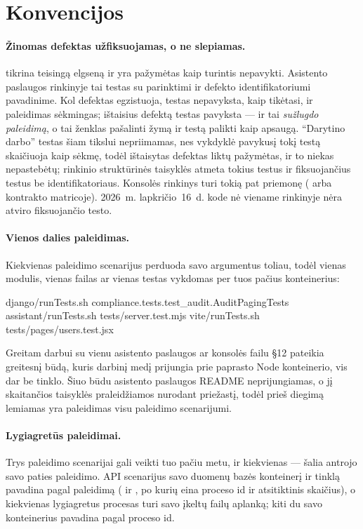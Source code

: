 \section{Konvencijos}\label{sec:testing:conventions}

\paragraph{Žinomas defektas užfiksuojamas, o ne slepiamas.}  tikrina
teisingą elgseną ir yra pažymėtas kaip turintis nepavykti. Asistento paslaugos rinkinyje tai
testas su parinktimi  ir defekto identifikatoriumi pavadinime. Kol defektas
egzistuoja, testas nepavyksta, kaip tikėtasi, ir paleidimas sėkmingas; ištaisius defektą testas
pavyksta --- ir tai \emph{sužlugdo paleidimą}, o tai ženklas pašalinti žymą ir testą palikti kaip
apsaugą. \enquote{Darytino darbo} testas šiam tikslui nepriimamas, nes vykdyklė pavykusį tokį
testą skaičiuoja kaip sėkmę, todėl ištaisytas defektas liktų pažymėtas, ir to niekas nepastebėtų; rinkinio
struktūrinės taisyklės atmeta tokius testus ir fiksuojančius testus be identifikatoriaus.
Konsolės rinkinys turi tokią pat priemonę ( arba  kontrakto
matricoje). 2026~m. lapkričio~16~d. kode nė viename rinkinyje nėra atviro fiksuojančio testo.

\paragraph{Vienos dalies paleidimas.} Kiekvienas paleidimo scenarijus perduoda savo argumentus
toliau, todėl vienas modulis, vienas failas ar vienas testas vykdomas per tuos pačius
konteinerius:

\begin{codeblock}
django/runTests.sh compliance.tests.test_audit.AuditPagingTests
assistant/runTests.sh tests/server.test.mjs
vite/runTests.sh tests/pages/users.test.jsx
\end{codeblock}

Greitam darbui su vienu asistento paslaugos ar konsolės failu  §12
pateikia greitesnį būdą, kuris darbinį medį prijungia prie paprasto Node konteinerio, vis dar be
tinklo. Šiuo būdu asistento paslaugos README neprijungiamas, o jį skaitančios taisyklės
praleidžiamos nurodant priežastį, todėl prieš diegimą lemiamas yra paleidimas visu paleidimo
scenarijumi.

\paragraph{Lygiagretūs paleidimai.} Trys paleidimo scenarijai gali veikti tuo pačiu metu, ir
kiekvienas --- šalia antrojo savo paties paleidimo. API scenarijus savo duomenų bazės konteinerį
ir tinklą pavadina pagal paleidimą ( ir ,
po kurių eina proceso id ir atsitiktinis skaičius), o kiekvienas lygiagretus procesas turi savo
įkeltų failų aplanką; kiti du savo konteinerius pavadina pagal proceso id.



